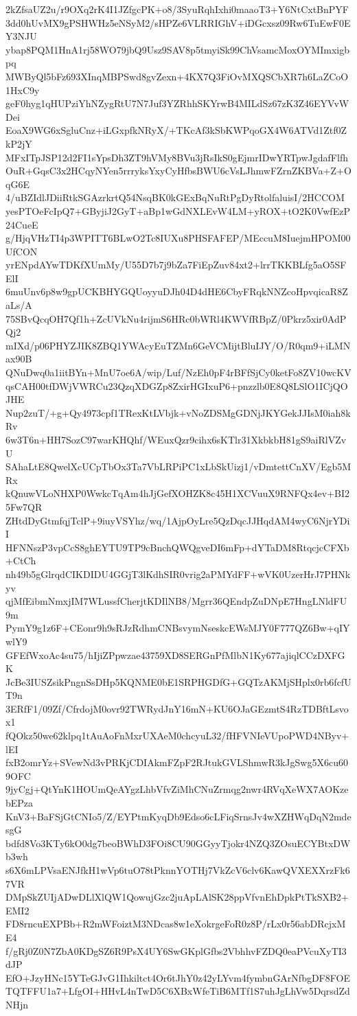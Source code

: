 2kZfsaUZ2u/r9OXq2rK4I1JZfgcPK+o8/3SyuRqhIxhi0maaoT3+Y6NtCxtBnPYF
3dd0hUvMX9gPSHWHz5eNSyM2/sHPZe6VLRRIGhV+iDGcxsz09Rw6TuEwF0EY3NJU
ybap8PQM1HnA1rj58WO79jbQ9Usz9SAV8p5tmyiSk99ChVsamcMoxOYMImxigbpq
MWByQl5bFz693XInqMBPSwd8gvZexn+4KX7Q3FiOvMXQSCbXR7h6LaZCoO1HxC9y
geF0hyg1qHUPziYhNZygRtU7N7Juf3YZRhhSKYrwB4MILdSz67zK3Z46EYVvWDei
EoaX9WG6xSgluCnz+iLGxpfkNRyX/+TKcAf3kSbKWPqoGX4W6ATVd1Ztf0ZkP2jY
MFxITpJSP12d2FI1sYpsDh3ZT9hVMy8BVu3jRsIkS0gEjmrIDwYRTpwJgdafFlfh
OuR+GqsC3x2HCqyNYen5rrryksYxyCyHfbsBWU6cVsLJhmwFZrnZKBVa+Z+OqG6E
4/uBZIdlJDiiRtkSGAzrkrtQ54NsqBK0kGExBqNuRtPgDyRtolfaluisI/2HCCOM
yesPTOeFcIpQ7+GByjiJ2GyT+aBp1wGdNXLEvW4LM+yROX+tO2K0VwfEzP24CueE
g/HjqVHzTI4p3WPITT6BLwO2Tc8IUXu8PHSFAFEP/MEccuM8IuejmHPOM00UfCON
yrENpdAYwTDKfXUmMy/U55D7b7j9bZa7FiEpZuv84xt2+lrrTKKBLfg5aO5SFElI
6muUnv6p8w9gpUCKBHYGQUoyyuDJh04D4dHE6CbyFRqkNNZcoHpvqicaR8ZaLs/A
75SBvQcqOH7Qf1h+ZcUVkNu4rijmS6HRc0bWRl4KWVfRBpZ/0Pkrz5xir0AdPQj2
mIXd/p06PHYZJIK8ZBQ1YWAcyEuTZMn6GeVCMijtBluIJY/O/R0qm9+iLMNax90B
QNuDwq0a1iitBYn+MnU7oe6A/wip/Luf/NzEh0pF4rBFfSjCy0ketFo8ZV10wcKV
qsCAH00tfDWjVWRCu23QzqXDGZp8ZxirHGIxuP6+pnzzlb0E8Q8LSlO1ICjQOJHE
Nup2zuT/+g+Qy4973cpf1TRexKtLVbjk+vNoZDSMgGDNjJKYGekJJIsM0iah8kRv
6w3T6n+HH7SozC97warKHQhf/WEuxQzr9cihx6sKTlr31XkbkbH81gS9aiRlVZvU
SAhaLtE8QwelXcUCpTbOx3Ta7VbLRPiPC1xLbSkUizj1/vDmtettCnXV/Egb5MRx
kQnuwVLoNHXP0WwkcTqAm4hJjGefXOHZK8c45H1XCVuuX9RNFQx4ev+BI25Fw7QR
ZHtdDyGtmfqjTclP+9iuyVSYhz/wq/1AjpOyLre5QzDqcJJHqdAM4wyC6NjrYDiI
HFNNszP3vpCcS8ghEYTU9TP9cBnchQWQgveDI6mFp+dYTaDM8RtqcjcCFXb+CtCh
nh49b5gGlrqdCIKDIDU4GGjT3lKdhSIR0vrig2aPMYdFF+wVK0UzerHrJ7PHNkyv
qjMfEibmNmxjIM7WLussfCherjtKDIlNB8/Mgrr36QEndpZuDNpE7HngLNldFU9m
PymY9g1z6F+CEonr9h9sRJzRdhmCNBsvymNseskcEWsMJY0F777QZ6Bw+qIYwlY9
GFEfWxoAc4su75/hIjiZPpwzae43759XD8SERGnPfMlbN1Ky677ajiqlCCzDXFGK
JcBe3IUSZsikPngnSsDHp5KQNME0bE1SRPHGDfG+GQTzAKMjSHplx0rb6fcfUT9n
3ERfF1/09Zf/CfrdojM0ovr92TWRydJnY16mN+KU6OJaGEzmtS4RzTDBftLsvox1
fQOkz50we62klpq1tAuAoFnMxrUXAeM0chcyuL32/fHFVNIeVUpoPWD4NByv+lEI
fxB2omrYz+SVewNd3vPRKjCDIAkmFZpF2RJtukGVLShmwR3kJgSwg5X6cu609OFC
9jyCgj+QtYnK1HOUmQeAYgzLhbVfvZiMhCNuZrmqg2nwr4RVqXeWX7AOKzebEPza
KnV3+BaFSjGtCNIo5/Z/EYPtmKyqDb9Edso6cLFiqSrnsJv4wXZHWqDqN2mdesgG
bdfd8Vo3KTy6kO0dg7beoBWhD3FOi8CU90GGyyTjokr4NZQ3ZOsuECYBtxDWb3wh
s6X6mLPVsaENJfkH1wVp6tuO78tPknnYOTHj7VkZcV6clv6KawQVXEXXrzFk67VR
DMpSkZUIjADwDLlXlQW1QowujGzc2juApLAlSK28ppVfvnEhDpkPtTkSXB2+EMI2
FD8rncuEXPBb+R2mWFoiztM3NDcas8w1eXokrgeFoR0z8P/rLx0r56abDRcjxME4
f/gRj0Z0N7ZbA0KDgSZ6R9PsX4UY6SwGKplGfbs2VbhhvFZDQ0eaPVcuXyTI3dJP
EfO+JzyHNc15YTeGJvG1Ihkiltct4Or6tJhY0z42yLYvm4fymbnGArNfbgDF8FOE
TQTFFU1a7+LfgOI+HHvL4nTwD5C6XBxWfeTiB6MTf1S7uhJgLhVw5DqrsdZdNHjn
